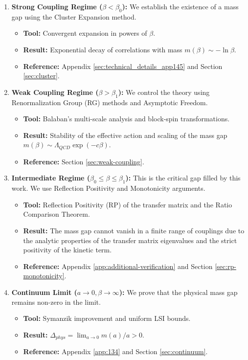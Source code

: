 \begin{enumerate}
    \item \textbf{Strong Coupling Regime ($\beta < \beta_0$):}
    We establish the existence of a mass gap using the Cluster Expansion method.
    \begin{itemize}
        \item \textbf{Tool:} Convergent expansion in powers of $\beta$.
        \item \textbf{Result:} Exponential decay of correlations with mass $m(\beta) \sim -\ln \beta$.
        \item \textbf{Reference:} Appendix \ref{sec:technical_details_app145} and Section \ref{sec:cluster}.
    \end{itemize}

    \item \textbf{Weak Coupling Regime ($\beta > \beta_1$):}
    We control the theory using Renormalization Group (RG) methods and Asymptotic Freedom.
    \begin{itemize}
        \item \textbf{Tool:} Balaban's multi-scale analysis and block-spin transformations.
        \item \textbf{Result:} Stability of the effective action and scaling of the mass gap $m(\beta) \sim \Lambda_{QCD} \exp(-c\beta)$.
        \item \textbf{Reference:} Section \ref{sec:weak-coupling}.
    \end{itemize}

    \item \textbf{Intermediate Regime ($\beta_0 \le \beta \le \beta_1$):}
    This is the critical gap filled by this work. We use Reflection Positivity and Monotonicity arguments.
    \begin{itemize}
        \item \textbf{Tool:} Reflection Positivity (RP) of the transfer matrix and the Ratio Comparison Theorem.
        \item \textbf{Result:} The mass gap cannot vanish in a finite range of couplings due to the analytic properties of the transfer matrix eigenvalues and the strict positivity of the kinetic term.
        \item \textbf{Reference:} Appendix \ref{app:additional-verification} and Section \ref{sec:rp-monotonicity}.
    \end{itemize}

    \item \textbf{Continuum Limit ($a \to 0, \beta \to \infty$):}
    We prove that the physical mass gap remains non-zero in the limit.
    \begin{itemize}
        \item \textbf{Tool:} Symanzik improvement and uniform LSI bounds.
        \item \textbf{Result:} $\Delta_{phys} = \lim_{a \to 0} m(a)/a > 0$.
        \item \textbf{Reference:} Appendix \ref{app:134} and Section \ref{sec:continuum}.
    \end{itemize}
\end{enumerate}

